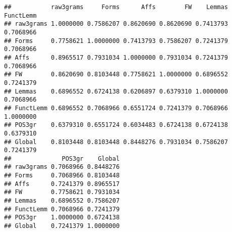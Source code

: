 \documentclass[]{article}
\begin{document}
\begin{verbatim}
##           raw3grams     Forms      Affs        FW    Lemmas FunctLemm
## raw3grams 1.0000000 0.7586207 0.8620690 0.8620690 0.7413793 0.7068966
## Forms     0.7758621 1.0000000 0.7413793 0.7586207 0.7241379 0.7068966
## Affs      0.8965517 0.7931034 1.0000000 0.7931034 0.7241379 0.7068966
## FW        0.8620690 0.8103448 0.7758621 1.0000000 0.6896552 0.7241379
## Lemmas    0.6896552 0.6724138 0.6206897 0.6379310 1.0000000 0.7068966
## FunctLemm 0.6896552 0.7068966 0.6551724 0.7241379 0.7068966 1.0000000
## POS3gr    0.6379310 0.6551724 0.6034483 0.6724138 0.6724138 0.6379310
## Global    0.8103448 0.8103448 0.8448276 0.7931034 0.7586207 0.7241379
##              POS3gr    Global
## raw3grams 0.7068966 0.8448276
## Forms     0.7068966 0.8103448
## Affs      0.7241379 0.8965517
## FW        0.7758621 0.7931034
## Lemmas    0.6896552 0.7586207
## FunctLemm 0.7068966 0.7241379
## POS3gr    1.0000000 0.6724138
## Global    0.7241379 1.0000000
\end{verbatim}
\end{document}
